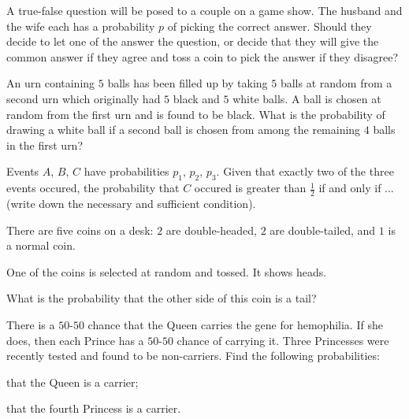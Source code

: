 \begin{problem}[Handout 4, \# 12]
  A true-false question will be posed to a couple on a game show. The
  husband and the wife each has a probability \(p\) of picking the correct
  answer. Should they decide to let one of the answer the question, or
  decide that they will give the common answer if they agree and toss a
  coin to pick the answer if they disagree?
\end{problem}
\begin{solution*}

\end{solution*}

\begin{problem}[Handout 4, \# 13]
  An urn containing \(5\) balls has been filled up by taking \(5\) balls at
  random from a second urn which originally had \(5\) black and \(5\) white
  balls. A ball is chosen at random from the first urn and is found to be
  black. What is the probability of drawing a white ball if a second ball
  is chosen from among the remaining \(4\) balls in the first urn?
\end{problem}
\begin{solution*}
\end{solution*}

\begin{problem}[Handout 4, \# 15]
  Events \(A\), \(B\), \(C\) have probabilities \(p_1\), \(p_2\),
  \(p_3\). Given that exactly two of the three events occured, the
  probability that \(C\) occured is greater than \(\frac{1}{2}\) if and
  only if ...\@ (write down the necessary and sufficient condition).
\end{problem}
\begin{solution*}
\end{solution*}

\begin{problem}[Handout 5, \# 1]
  There are five coins on a desk: \(2\) are double-headed, \(2\) are
  double-tailed, and \(1\) is a normal coin.

  \noindent One of the coins is selected at random and tossed. It shows
  heads.

  \noindent What is the probability that the other side of this coin is a
  tail?
\end{problem}
\begin{solution*}
\end{solution*}

\begin{problem}
  There is a \(50\)-\(50\) chance that the Queen carries the gene for
  hemophilia. If she does, then each Prince has a \(50\)-\(50\) chance of
  carrying it. Three Princesses were recently tested and found to be
  non-carriers. Find the following probabilities:
  \begin{alphlist}
  \item that the Queen is a carrier;
  \item that the fourth Princess is a carrier.
  \end{alphlist}
\end{problem}
\begin{solution*}
\end{solution*}

